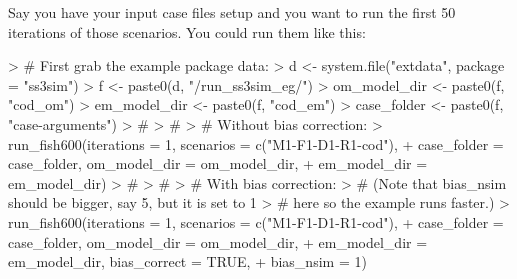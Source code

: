 \documentclass[12pt]{article}
\begin{document}
Say you have your input case files setup and you want to run the first 
50 iterations of those scenarios. You could run them like this:

\begin{Schunk}
\begin{Sinput}
> # First grab the example package data:
> d <- system.file("extdata", package = "ss3sim")
> f <- paste0(d, "/run_ss3sim_eg/")
> om_model_dir <- paste0(f, "cod_om")
> em_model_dir <- paste0(f, "cod_em")
> case_folder <- paste0(f, "case-arguments")
> #
> #
> # Without bias correction:
> run_fish600(iterations = 1, scenarios = c("M1-F1-D1-R1-cod"),
+ case_folder = case_folder, om_model_dir = om_model_dir,
+ em_model_dir = em_model_dir)
> #
> #
> # With bias correction:
> # (Note that bias_nsim should be bigger, say 5, but it is set to 1
> # here so the example runs faster.)
> run_fish600(iterations = 1, scenarios = c("M1-F1-D1-R1-cod"),
+ case_folder = case_folder, om_model_dir = om_model_dir,
+ em_model_dir = em_model_dir, bias_correct = TRUE,
+ bias_nsim = 1)
\end{Sinput}
\end{Schunk}








  
\end{document}

